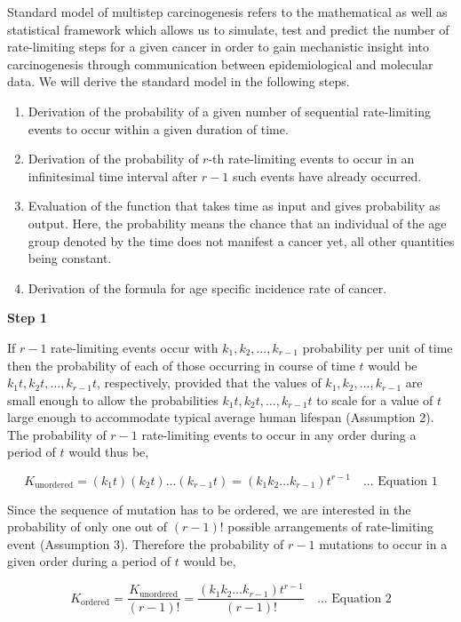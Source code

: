 \documentclass[lineno,sn-basic, Numbered]{sn-jnl}%
\theoremstyle{thmstyleone}%
\theoremstyle{thmstyletwo}%
\theoremstyle{thmstylethree}%
\begin{document}
Standard model of multistep carcinogenesis refers to the mathematical as well as statistical framework which allows us to simulate, test and predict the number of rate-limiting steps for a given cancer in order to gain mechanistic insight into carcinogenesis through communication between epidemiological and molecular data. We will derive the standard model in the following steps.

\begin{enumerate}
    \item Derivation of the probability of a given number of sequential rate-limiting events to occur within a given duration of time.
    \item Derivation of the probability of \( r \)-th rate-limiting events to occur in an infinitesimal time interval after \( r - 1 \) such events have already occurred.
    \item Evaluation of the function that takes time as input and gives probability as output. Here, the probability means the chance that an individual of the age group denoted by the time does not manifest a cancer yet, all other quantities being constant.
    \item Derivation of the formula for age specific incidence rate of cancer.
\end{enumerate}

\textbf{Step 1}

If \( r - 1 \) rate-limiting events occur with \( k_1, k_2, \ldots, k_{r-1} \) probability per unit of time then the probability of each of those occurring in course of time \( t \) would be \( k_1t, k_2t, \ldots, k_{r-1}t \), respectively, provided that the values of \( k_1, k_2, \ldots, k_{r-1} \) are small enough to allow the probabilities \( k_1t, k_2t, \ldots, k_{r-1}t \) to scale for a value of \( t \) large enough to accommodate typical average human lifespan (Assumption 2). The probability of \( r - 1 \) rate-limiting events to occur in any order during a period of \( t \) would thus be,

\[ K_{\text{unordered}} = (k_1t) (k_2t) \ldots (k_{r-1}t) = (k_1k_2\ldots k_{r-1})t^{r-1} \quad \text{... Equation 1} \]

Since the sequence of mutation has to be ordered, we are interested in the probability of only one out of \( (r - 1)! \) possible arrangements of rate-limiting event (Assumption 3). Therefore the probability of \( r - 1 \) mutations to occur in a given order during a period of \( t \) would be,

\[ K_{\text{ordered}} = \frac{K_{\text{unordered}}}{(r - 1)!} = \frac{(k_1k_2\ldots k_{r-1})t^{r-1}}{(r - 1)!} \quad \text{... Equation 2} \]
\end{document}

